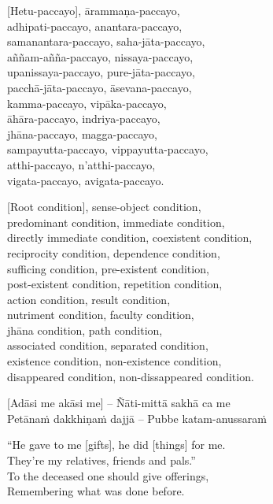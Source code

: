[Hetu-paccayo], ārammaṇa-paccayo,\\
adhipati-paccayo, anantara-paccayo,\\
samanantara-paccayo, saha-jāta-paccayo,\\
aññam-añña-paccayo, nissaya-paccayo,\\
upanissaya-paccayo, pure-jāta-paccayo,\\
pacchā-jāta-paccayo, āsevana-paccayo,\\
kamma-paccayo, vipāka-paccayo,\\
āhāra-paccayo, indriya-paccayo,\\
jhāna-paccayo, magga-paccayo,\\
sampayutta-paccayo, vippayutta-paccayo,\\
atthi-paccayo, n’atthi-paccayo,\\
vigata-paccayo, avigata-paccayo.

\begin{english}
  [Root condition], sense-object condition,\\
  predominant condition, immediate condition,\\
  directly immediate condition, coexistent condition,\\
  reciprocity condition, dependence condition,\\
  sufficing condition, pre-existent condition,\\
  post-existent condition, repetition condition,\\
  action condition, result condition,\\
  nutriment condition, faculty condition,\\
  jhāna condition, path condition,\\
  associated condition, separated condition,\\
  existence condition, non-existence condition,\\
  disappeared condition, non-dissappeared condition.
\end{english}

\suttaRef{[Dhs A]}

[Adāsi me akāsi me] – Ñāti-mittā sakhā ca me\\
Petānaṁ dakkhiṇaṁ dajjā – Pubbe katam-anussaraṁ

\begin{english}
  “He gave to me [gifts], he did [things] for me.\\
  They're my relatives, friends and pals.”\\
  To the deceased one should give offerings,\\
  Remembering what was done before.
\end{english}

